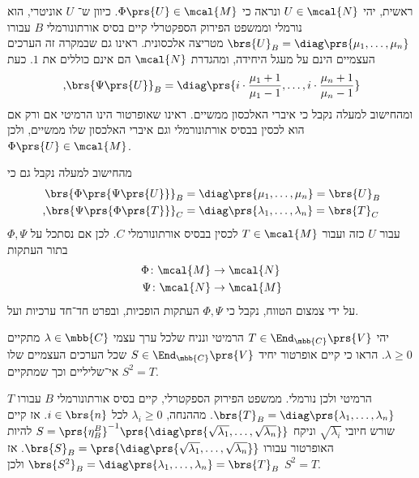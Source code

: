 \documentclass[a4paper,10pt,twoside,openany]{book}
\begin{document}
\begin{solution}
\begin{enumerate}
ראשית, יהי
$U \in \mcal{N}$
ונראה כי
$\Phi\prs{U} \in \mcal{M}$.
כיוון ש־%
$U$
אוניטרי, הוא נורמלי וממשפט הפירוק הספקטרלי קיים בסיס אורתונורמלי
$B$
עבורו
$\brs{U}_B = \diag\prs{\mu_1, \ldots, \mu_n}$
מטריצה אלכסונית. ראינו גם שבמקרה זה הערכים העצמיים הינם על מעגל היחידה, ומהגדרת
$\mcal{N}$
הם אינם כוללים את
$1$.
כעת
\[\text{,} \brs{\Psi\prs{U}}_B = \diag\prs{i \cdot \frac{\mu_1 + 1}{\mu_1 - 1}, \ldots, i \cdot \frac{\mu_n + 1}{\mu_n - 1}}\]
ומהחישוב למעלה נקבל כי איברי האלכסון ממשיים. ראינו שאופרטור הינו הרמיטי אם ורק אם הוא לכסין בבסיס אורתונורמלי וגם איברי האלכסון שלו ממשיים, ולכן
$\Phi\prs{U} \in \mcal{M}$.

מהחישוב למעלה נקבל גם כי
\begin{align*}
\brs{\Phi\prs{\Psi\prs{U}}}_B &= \diag\prs{\mu_1, \ldots, \mu_n} = \brs{U}_B \\
\text{,} \brs{\Psi \prs{\Phi\prs{T}}}_C &= \diag\prs{\lambda_1, \ldots, \lambda_n} = \brs{T}_C 
\end{align*}
עבור
$U$
כזה ועבור
$T \in \mcal{M}$
לכסין בבסיס אורתונורמלי
$C$.
לכן אם נסתכל על
$\Phi, \Psi$
בתור העתקות
\begin{align*}
\Phi \colon \mcal{M} &\to \mcal{N} \\
\Psi \colon \mcal{N} &\to \mcal{M}
\end{align*}
על ידי צמצום הטווח, נקבל כי
$\Phi, \Psi$
העתקות הופכיות, ובפרט חד־חד ערכיות ועל.

\end{enumerate}
\end{solution}

\begin{exercisechap}
יהי
$T \in \End_{\mbb{C}}\prs{V}$
הרמיטי ונניח שלכל ערך עצמי
$\lambda \in \mbb{C}$
מתקיים
$\lambda \geq 0$.
הראו כי קיים אופרטור יחיד
$S \in \End_{\mbb{C}}\prs{V}$
שכל הערכים העצמיים שלו אי־שליליים וכך שמתקיים
$S^2 = T$.
\end{exercisechap}

\begin{solution}
$T$
הרמיטי ולכן נורמלי. ממשפט הפירוק הספקטרלי, קיים בסיס אורתונורמלי
$B$
עבורו
$\brs{T}_B = \diag\prs{\lambda_1, \ldots, \lambda_n}$.
מההנחה,
$\lambda_i \geq 0$
לכל
$i \in \brs{n}$.
אז קיים שורש חיובי
$\sqrt{\lambda_i}$
וניקח
$S = \prs{\eta^B_B}^{-1} \prs{\diag\prs{\sqrt{\lambda_1}, \ldots, \sqrt{\lambda_n}}}$
להיות האופרטור עבורו
$\brs{S}_B = \prs{\diag\prs{\sqrt{\lambda_1}, \ldots, \sqrt{\lambda_n}}}$.
אז
$\brs{S^2}_B = \diag\prs{\lambda_1, \ldots, \lambda_n} = \brs{T}_B$
ולכן
$S^2 = T$.
\end{solution}
\end{document}
